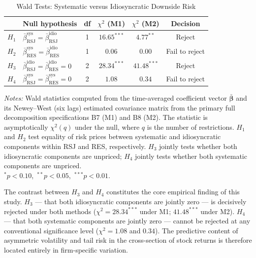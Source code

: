 \documentclass[11pt,a4paper]{article}
\begin{document}
\begin{table}[!htbp]
\centering
\caption{Wald Tests: Systematic versus Idiosyncratic Downside Risk}
\label{tab:wald_tests}
\small
\begin{threeparttable}
\begin{tabular}{l l c c c c}
\toprule
 & Null hypothesis & df
   & $\chi^2$ (M1) & $\chi^2$ (M2) & Decision \\
\midrule
$H_1$ & $\bar\beta^{\text{sys}}_{\text{RSJ}} = \bar\beta^{\text{idio}}_{\text{RSJ}}$
  & 1 & $16.65^{***}$ & $4.77^{**}$ & Reject \\[3pt]
$H_2$ & $\bar\beta^{\text{sys}}_{\text{RES}} = \bar\beta^{\text{idio}}_{\text{RES}}$
  & 1 & $0.06$ & $0.00$ & Fail to reject \\[3pt]
$H_3$ & $\bar\beta^{\text{idio}}_{\text{RSJ}} = \bar\beta^{\text{idio}}_{\text{RES}} = 0$
  & 2 & $28.34^{***}$ & $41.48^{***}$ & Reject \\[3pt]
$H_4$ & $\bar\beta^{\text{sys}}_{\text{RSJ}} = \bar\beta^{\text{sys}}_{\text{RES}} = 0$
  & 2 & $1.08$ & $0.34$ & Fail to reject \\
\bottomrule
\end{tabular}
\begin{tablenotes}
\footnotesize
\item \textit{Notes:} Wald statistics computed from the time-averaged coefficient
vector $\bar{\bm{\beta}}$ and its Newey--West (six lags) estimated covariance matrix
from the primary full decomposition specifications B7 (M1) and B8 (M2). The statistic
is asymptotically $\chi^2(q)$ under the null, where $q$ is the number of
restrictions. $H_1$ and $H_2$ test equality of risk prices between systematic and
idiosyncratic components within RSJ and RES, respectively. $H_3$ jointly tests whether
both idiosyncratic components are unpriced; $H_4$ jointly tests whether both systematic
components are unpriced. \\
$^{*}p<0.10$,\ $^{**}p<0.05$,\ $^{***}p<0.01$.
\end{tablenotes}
\end{threeparttable}
\end{table}

The contrast between $H_3$ and $H_4$ constitutes the core empirical finding of this
study. $H_3$ --- that both idiosyncratic components are jointly zero --- is decisively
rejected under both methods ($\chi^2 = 28.34^{***}$ under M1; $41.48^{***}$ under M2).
$H_4$ --- that both systematic components are jointly zero --- cannot be rejected at any
conventional significance level ($\chi^2 = 1.08$ and $0.34$). The predictive content of
asymmetric volatility and tail risk in the cross-section of stock returns is therefore
located entirely in firm-specific variation.
\end{document}
